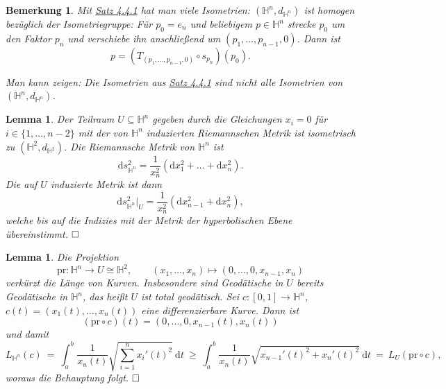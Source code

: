 \documentclass[11pt]{book}
\numberwithin{dummy}{section}
\newtheorem{lemma}[theorem]{Lemma}
\newtheorem{remark}[theorem]{Bemerkung}
\theoremstyle{nonumberbreak}
\newenvironment{pr}[1][]{\ifthenelse{\equal{#1}{}}{\proof}{\proof[#1]}\rm}{\endproof}
\newcommand{\He}{\mathbb{H}}
\newcommand{\la}{\longrightarrow}
\begin{document}
\begin{spacing}{1.4}
\begin{remark}

Mit \hyperlink{satzvierviereins}{Satz 4.4.1} hat man viele Isometrien: $(\He^n, d_{\He^n})$ ist homogen bezüglich der Isometriegruppe: Für $p_0=e_n$ und beliebigem $p \in \He^n$ strecke $p_0$ um den Faktor $p_n$ und verschiebe ihn anschließend um $(p_1, \ldots, p_{n-1}, 0)$. Dann ist 
$$p=\left( T_{(p_1, \ldots, p_{n-1},0)} \circ s_{p_n}\right)(p_0).$$
\item Man kann zeigen: Die Isometrien aus \hyperlink{satzvierviereins}{Satz 4.4.1} sind nicht alle Isometrien von $(\He^n, d_{\He^n})$. 


\end{remark}



\hypertarget{lemmaviervierzwei}{}
\begin{lemma}   %
Der Teilraum $U \subseteq \He^n$ gegeben durch die Gleichungen $x_i=0$ für $i \in \{1, \ldots, n-2\}$ mit der von $\He^n$ induzierten Riemannschen Metrik ist isometrisch zu $(\He^2, d_{\He^2})$.
\begin{pr}
Die Riemannsche Metrik von $\He^n$ ist 
$$\mathrm{d}s_{\He^n}^2 = \frac{1}{x_n^2} \left( \mathrm{d}x_1^2 + \ldots + \mathrm{d}x_n^2\right).$$
Die auf $U$ induzierte Metrik ist dann 
$$\mathrm{d}s_{\He^n}^2 \vert_U = \frac{1}{x_n^2} \left( \mathrm{d}x_{n-1}^2 + \mathrm{d}x_n^2 \right),$$
welche bis auf die Indizies mit der Metrik der hyperbolischen Ebene übereinstimmt. $\hfill \Box$
\end{pr}

\end{lemma}

\begin{lemma}
Die Projektion $$\mathrm{pr}: \He^n \la U \cong \He^2, \qquad (x_1, \ldots, x_n) \mapsto (0,\ldots, 0, x_{n-1}, x_n)$$ verkürzt die Länge von Kurven. Insbesondere sind Geodätische in $U$ bereits Geodätische in $\He^n$, das heißt $U$ ist \textit{total geodätisch}.
\begin{pr}
Sei $c: [0,1] \la \He^n$, $c(t) = (x_1(t), \ldots, x_n(t))$ eine differenzierbare Kurve. Dann ist 
$$(\mathrm{pr} \circ c)(t) = (0,\ldots, 0, x_{n-1}(t), x_n(t))$$
und damit
$$L_{\He^n}(c) \ = \ \int_a^b \frac{1}{x_n(t)} \sqrt{ \sum_{i=1}^n x_i'(t)^2} \ \mathrm{d}t \ \geqslant \ \int_a^b \frac{1}{x_n(t)} \sqrt{ x_{n-1}'(t)^2 + x_n'(t)^2} \ \mathrm{d}t \ = \ L_U(\mathrm{pr} \circ c),$$
woraus die Behauptung folgt. $\hfill \Box$

\end{pr}


\end{lemma}
\end{spacing}
\end{document}
